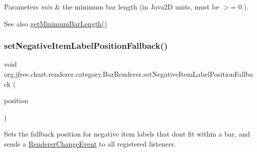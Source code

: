 \begin{DoxyParams}{Parameters}
{\em min} & the minimum bar length (in Java2D units, must be $>$= 0.).\\
\hline
\end{DoxyParams}
\begin{DoxySeeAlso}{See also}
\mbox{\hyperlink{classorg_1_1jfree_1_1chart_1_1renderer_1_1category_1_1_bar_renderer_a3ab1b4f3db7af3d3738dec75eac4fe08}{get\+Minimum\+Bar\+Length()}} 
\end{DoxySeeAlso}
\mbox{\label{classorg_1_1jfree_1_1chart_1_1renderer_1_1category_1_1_bar_renderer_a20b8984062c72c1200530d221c2925f9}} 
\subsubsection{\texorpdfstring{set\+Negative\+Item\+Label\+Position\+Fallback()}{setNegativeItemLabelPositionFallback()}}
{\footnotesize\ttfamily void org.\+jfree.\+chart.\+renderer.\+category.\+Bar\+Renderer.\+set\+Negative\+Item\+Label\+Position\+Fallback (\begin{DoxyParamCaption}\item[{\mbox{\hyperlink{classorg_1_1jfree_1_1chart_1_1labels_1_1_item_label_position}{Item\+Label\+Position}}}]{position }\end{DoxyParamCaption})}

Sets the fallback position for negative item labels that don\textquotesingle{}t fit within a bar, and sends a \mbox{\hyperlink{}{Renderer\+Change\+Event}} to all registered listeners.


